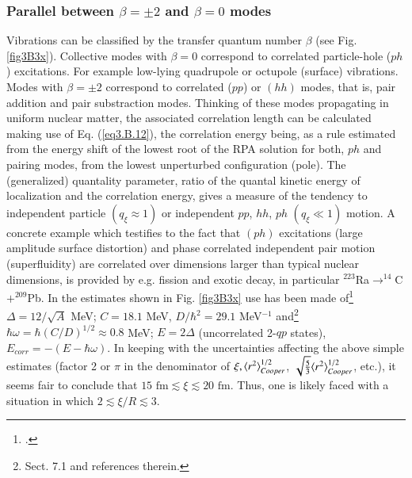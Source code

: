          \subsubsection{Parallel between $\beta=\pm2$ and $\beta=0$ modes}
         Vibrations can be classified by the transfer quantum number $\beta$ (see Fig. \ref{fig3B3x}). Collective modes with $\beta=0$ correspond to correlated particle-hole ($ph$) excitations. For example low-lying quadrupole or octupole (surface)  vibrations. Modes with  $\beta=\pm2$  correspond to correlated ($pp$) or $(hh)$ modes, that is, pair addition and pair substraction modes.
         Thinking of these modes propagating in uniform nuclear matter, the associated correlation length can be calculated making use of Eq. (\ref{eq3.B.12}), the correlation energy being, as a rule estimated from the energy shift of the lowest root of the RPA solution for both, $ph$ and pairing modes, from the lowest unperturbed configuration (pole). The (generalized) quantality parameter, ratio of the quantal kinetic energy of localization and the correlation energy,  gives a measure of the tendency to independent particle $(q_\xi\approx1)$ or independent $pp$, $hh$, $ph$ $(q_\xi\ll1)$ motion. A concrete example which testifies to the fact that $(ph)$ excitations (large amplitude surface distortion) and phase correlated independent pair motion (superfluidity) are correlated over dimensions larger than typical nuclear dimensions, is provided by e.g. fission and exotic decay, in particular $^{223}$Ra$\rightarrow^{14}$C$+^{209}$Pb. In the  estimates shown in Fig. \ref{fig3B3x} use has been made of\footnote{\cite{Bohr:69}.} $\Delta=12/\sqrt{A}$ MeV; $C=18.1$ MeV, $D/\hbar^2=29.1$ MeV$^{-1}$ and\footnote{\cite{Brink:05} Sect. 7.1 and references therein.} $\hbar\omega=\hbar(C/D)^{1/2}\approx0.8$ MeV; $E=2\Delta$ (uncorrelated 2-$qp$ states), $E_{corr}=-(E-\hbar\omega)$. In keeping with the uncertainties affecting the above simple estimates (factor 2 or $\pi$ in the denominator of $\xi,\langle {r^2} \rangle^{1/2}_{Cooper}$,  $\sqrt{\frac{5}{3}}\langle {r^2} \rangle^{1/2}_{Cooper}$, etc.), it seems fair to conclude that $15\text{ fm}\lesssim\xi\lesssim20\text{ fm}$. Thus, one is likely faced with a  situation in which $2\lesssim\xi/R\lesssim3.$
